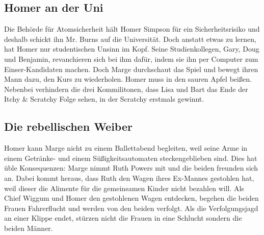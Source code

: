 	
\subsection{Homer an der Uni}\label{1F02}
Die Behörde für Atomsicherheit hält Homer Simpson für ein Sicherheitsrisiko und deshalb schickt ihn Mr. Burns auf die Universität. Doch anstatt etwas zu lernen, hat Homer nur studentischen Unsinn im Kopf. Seine Studienkollegen, Gary, Doug und Benjamin, revanchieren sich bei ihm dafür, indem sie ihn per Computer zum Einser-Kandidaten machen. Doch Marge durchschaut das Spiel und bewegt ihren Mann dazu, den Kurs zu wiederholen. Homer muss in den sauren Apfel beißen.
Nebenbei verhindern die drei Kommilitonen, dass Lisa und Bart das Ende der Itchy \& Scratchy Folge sehen, in der Scratchy erstmals gewinnt.


	
\subsection{Die rebellischen Weiber}\label{1F03}
Homer kann Marge nicht zu einem Ballettabend begleiten, weil seine Arme in einem Getränke- und einem Süßigkeitsautomaten steckengeblieben sind. Dies hat üble Konsequenzen: Marge nimmt Ruth Powers mit und die beiden freunden sich an. Dabei kommt heraus, dass Ruth den Wagen ihres Ex-Mannes gestohlen hat, weil dieser die Alimente für die gemeinsamen Kinder nicht bezahlen will. Als Chief Wiggum und Homer den gestohlenen Wagen entdecken, begehen die beiden Frauen Fahrerflucht und werden von den beiden verfolgt. Als die Verfolgungsjagd an einer Klippe endet, stürzen nicht die Frauen in eine Schlucht sondern die beiden Männer.

